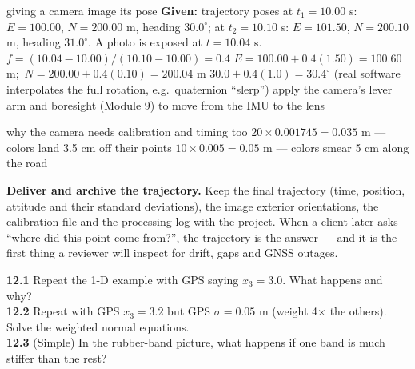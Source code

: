 \begin{worked}{giving a camera image its pose}
\textbf{Given:} trajectory poses at $t_1=10.00$ s: $E=100.00$, $N=200.00$ m, heading $30.0^\circ$; at $t_2=10.10$ s: $E=101.50$, $N=200.10$ m, heading $31.0^\circ$. A photo is exposed at $t=10.04$ s.
 $f=(10.04-10.00)/(10.10-10.00)=0.4$
 $E=100.00+0.4(1.50)=100.60$ m;\ $N=200.00+0.4(0.10)=200.04$ m
 $30.0+0.4(1.0)=30.4^\circ$ (real software interpolates the full rotation, e.g.\ quaternion ``slerp'')
 apply the camera's lever arm and boresight (Module 9) to move from the IMU to the lens
\end{worked}

\begin{worked}{why the camera needs calibration and timing too}
 $20\times0.001745=0.035$ m --- colors land 3.5 cm off their points
 $10\times0.005=0.05$ m --- colors smear 5 cm along the road
\end{worked}

\begin{tip}
\textbf{Deliver and archive the trajectory.} Keep the final trajectory (time, position, attitude and their standard deviations), the image exterior orientations, the calibration file and the processing log with the project. When a client later asks ``where did this point come from?'', the trajectory is the answer --- and it is the first thing a reviewer will inspect for drift, gaps and GNSS outages.
\end{tip}

\begin{tryit}
\textbf{12.1} Repeat the 1-D example with GPS saying $x_3=3.0$. What happens and why?\\
\textbf{12.2} Repeat with GPS $x_3=3.2$ but GPS $\sigma=0.05$ m (weight 4$\times$ the others). Solve the weighted normal equations.\\
\textbf{12.3} (Simple) In the rubber-band picture, what happens if one band is much stiffer than the rest?
\end{tryit}

